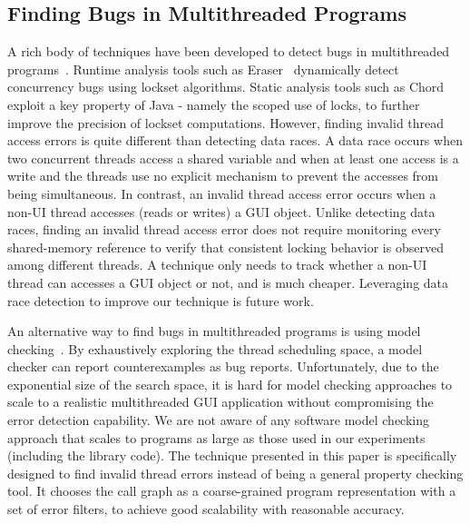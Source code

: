 \tinystep
\subsection{Finding Bugs in Multithreaded Programs}


A rich body of techniques have been developed to detect bugs in multithreaded programs~\cite{Huang:2011:PPC:2001420.2001438, Naik:2006, Savage:1997, smc}.
Runtime analysis tools such as Eraser~\cite{Savage:1997} 
dynamically detect concurrency bugs using lockset algorithms.
Static analysis tools such as Chord~\cite{Naik:2006}
exploit a key property of Java - namely the scoped use
of locks, to further improve the precision of lockset computations.
However, finding invalid thread access errors is quite different than detecting data races.
A data race occurs when two concurrent threads access
a shared variable and when at least one access is a write and the threads
use no explicit mechanism to prevent the accesses from being simultaneous. In contrast,
an invalid thread access error occurs when a non-UI thread accesses (reads or writes) a GUI object.
Unlike detecting data races, finding an invalid thread access error does not require monitoring every shared-memory
reference to verify that consistent locking behavior is observed among different threads.
A technique only needs to track whether a non-UI thread can accesses a GUI object or not,
and is much cheaper. Leveraging data race detection to 
improve our technique is future work.


An alternative way to find bugs in multithreaded programs is using model checking~\cite{smc}.
By exhaustively exploring the thread scheduling space, a model checker can
report counterexamples as bug reports.
Unfortunately, due to the exponential size of the search space,
it is hard for model checking approaches to scale to a realistic multithreaded GUI application
 without compromising the error detection capability. 
We are not aware of any software model checking approach that scales to programs
as large as those used in our experiments (including the library code).
The technique presented in this paper is specifically designed to find invalid thread
errors instead of being a general property checking tool. 
It chooses the call graph as a coarse-grained program representation with a
set of error filters, to achieve good scalability with reasonable accuracy.

